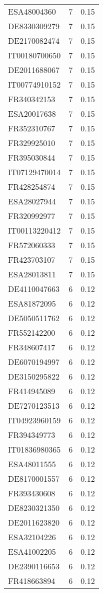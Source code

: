 \begin{table*}[htbp]
\begin{tabular}{lrr}
ESA48004360 & 7 & 0.15 \\
DE8330309279 & 7 & 0.15 \\
DE2170082474 & 7 & 0.15 \\
IT00180700650 & 7 & 0.15 \\
DE2011688067 & 7 & 0.15 \\
IT00774910152 & 7 & 0.15 \\
FR340342153 & 7 & 0.15 \\
ESA20017638 & 7 & 0.15 \\
FR352310767 & 7 & 0.15 \\
FR329925010 & 7 & 0.15 \\
FR395030844 & 7 & 0.15 \\
IT07129470014 & 7 & 0.15 \\
FR428254874 & 7 & 0.15 \\
ESA28027944 & 7 & 0.15 \\
FR320992977 & 7 & 0.15 \\
IT00113220412 & 7 & 0.15 \\
FR572060333 & 7 & 0.15 \\
FR423703107 & 7 & 0.15 \\
ESA28013811 & 7 & 0.15 \\
DE4110047663 & 6 & 0.12 \\
ESA81872095 & 6 & 0.12 \\
DE5050511762 & 6 & 0.12 \\
FR552142200 & 6 & 0.12 \\
FR348607417 & 6 & 0.12 \\
DE6070194997 & 6 & 0.12 \\
DE3150295822 & 6 & 0.12 \\
FR414945089 & 6 & 0.12 \\
DE7270123513 & 6 & 0.12 \\
IT04923960159 & 6 & 0.12 \\
FR394349773 & 6 & 0.12 \\
IT01836980365 & 6 & 0.12 \\
ESA48011555 & 6 & 0.12 \\
DE8170001557 & 6 & 0.12 \\
FR393430608 & 6 & 0.12 \\
DE8230321350 & 6 & 0.12 \\
DE2011623820 & 6 & 0.12 \\
ESA32104226 & 6 & 0.12 \\
ESA41002205 & 6 & 0.12 \\
DE2390116653 & 6 & 0.12 \\
FR418663894 & 6 & 0.12 \\

\end{tabular}
\end{table*}
